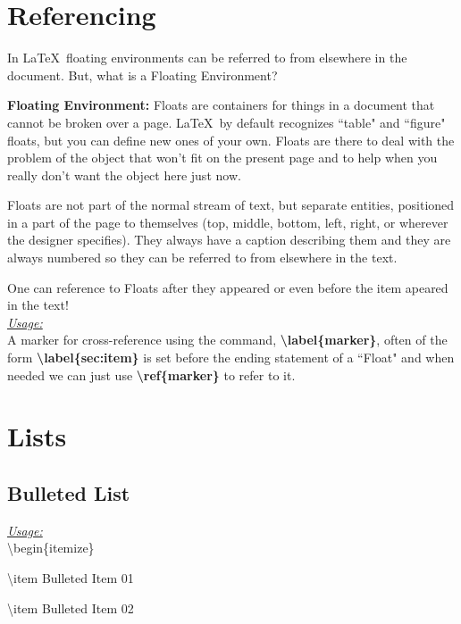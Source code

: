 \documentclass[12pt, twocolumn]{article}
\begin{document}
\section{Referencing}
In \LaTeX\ floating environments can be referred to from elsewhere in the document. But, what is a Floating Environment?

\textbf{Floating Environment:} Floats are containers for things in a document that cannot be broken over a page. \LaTeX\ by default recognizes ``table" and ``figure" floats, but you can define new ones of your own. Floats are there to deal with the problem of the object that won't fit on the present page and to help when you really don't want the object here just now.

Floats are not part of the normal stream of text, but separate entities, positioned in a part of the page to themselves (top, middle, bottom, left, right, or wherever the designer specifies). They always have a caption describing them and they are always numbered so they can be referred to from elsewhere in the text.

One can reference to Floats after they appeared or even before the item apeared in the text! \\

 \underline{\textit{Usage:}} \\

 A marker for cross-reference using the command, \textbf{\textbackslash label\{marker\}}, often of the form \textbf{\textbackslash label\{sec:item\}} is set before the ending statement of a ``Float" and when needed we can just use \textbf{\textbackslash ref\{marker\}} to refer to it.

\section{Lists}

 \subsection{Bulleted List}
 
 \underline{\textit{Usage:}} \\
 
 \textbackslash begin\{itemize\}
 
 \hspace*{6mm} \textbackslash item Bulleted Item 01
 
 \hspace*{6mm} \textbackslash item Bulleted Item 02
 
\end{document}
